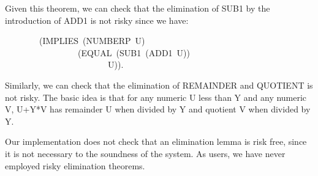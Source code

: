 \documentclass[11pt]{book}
\newenvironment{pubasis}{\begin{flushleft}\ttfamily\small}{\normalsize\rmfamily\end{flushleft}}
\begin{document}
Given this theorem, we can check that the elimination
of SUB1 by the introduction of ADD1 is not risky since
we have:
\begin{pubasis}
~~~~~~~~(IMPLIES~(NUMBERP~U)\\
~~~~~~~~~~~~~~~~~(EQUAL~(SUB1~(ADD1~U))\\
~~~~~~~~~~~~~~~~~~~~~~~~U)).\\
\end{pubasis}
Similarly, we can check that the elimination of
REMAINDER and QUOTIENT is not risky.  The basic
idea is that for any numeric U less than Y and any numeric
V,  U+Y*V has remainder U when divided by Y
and quotient V when divided by Y.

Our implementation does not check that
an elimination lemma is risk free, since it
is not necessary to the soundness of the system.
As users, we have never employed risky elimination
theorems.
\end{document}
